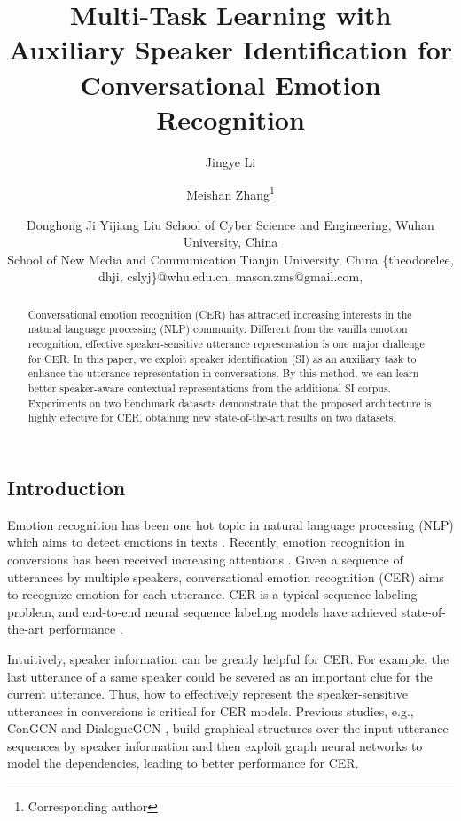 \documentclass{article}
\title{Multi-Task Learning with Auxiliary Speaker Identification for Conversational Emotion Recognition}
\author{
Jingye Li
\and
Meishan Zhang\footnote{Corresponding author}\and
Donghong Ji\And
Yijiang Liu
\affiliations
School of Cyber Science and Engineering, Wuhan University, China\\
School of New Media and Communication,Tianjin University, China
\emails
\{theodorelee, dhji, cslyj\}@whu.edu.cn,
mason.zms@gmail.com,
}
\begin{document}
\begin{CJK}{UTF8}{gbsn}
\maketitle

\begin{abstract}
Conversational emotion recognition (CER) has attracted increasing interests in the natural language processing (NLP) community.
Different from the vanilla emotion recognition, effective speaker-sensitive utterance representation is one major challenge for CER.   
In this paper, we exploit speaker identification (SI) as an auxiliary task to enhance the utterance representation in conversations.
By this method, we can learn better speaker-aware contextual representations from the additional SI corpus.
Experiments on two benchmark datasets demonstrate that the proposed architecture is highly effective for CER, obtaining new state-of-the-art results on two datasets.
\end{abstract}

\section{Introduction}
Emotion recognition has been one hot topic in natural language processing (NLP) which aims to 
detect emotions in texts \cite{wen2014emotion,li2015sentence}. 
Recently, emotion recognition in conversions has been received increasing attentions \cite{majumder2019dialoguernn,zhong2019knowledge,ghosal2019dialoguegcn}.
Given a sequence of utterances by multiple speakers, conversational emotion recognition (CER)
aims to recognize emotion for each utterance.
CER is a typical sequence labeling problem, and end-to-end neural sequence labeling models 
have achieved state-of-the-art performance \cite{poria2017context,Jiao2019higru}.  



Intuitively, speaker information can be greatly helpful for CER. 
For example, the last utterance of a same speaker could be severed as an important clue for the current utterance. 
Thus, how to effectively represent the speaker-sensitive utterances in conversions is critical for CER models.
Previous studies, e.g., ConGCN \cite{zhang2019Modeling} and DialogueGCN \cite{ghosal2019dialoguegcn},
build graphical structures over the input utterance sequences by speaker information and then exploit graph neural networks 
to model the dependencies, leading to better performance for CER.  



\end{CJK}
\end{document}
